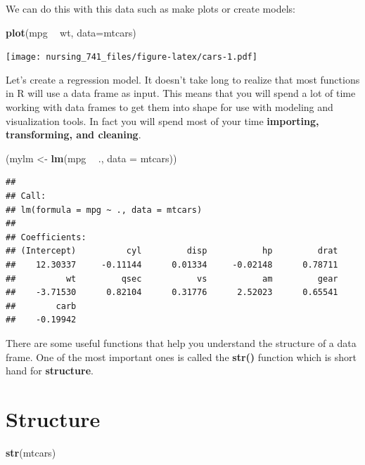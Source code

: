 \documentclass[]{book}
\newenvironment{Shaded}{\begin{snugshade}}{\end{snugshade}}
\newcommand{\KeywordTok}[1]{\textcolor[rgb]{0.13,0.29,0.53}{\textbf{#1}}}
\newcommand{\DataTypeTok}[1]{\textcolor[rgb]{0.13,0.29,0.53}{#1}}
\newcommand{\StringTok}[1]{\textcolor[rgb]{0.31,0.60,0.02}{#1}}
\newcommand{\OperatorTok}[1]{\textcolor[rgb]{0.81,0.36,0.00}{\textbf{#1}}}
\newcommand{\NormalTok}[1]{#1}
\begin{document}
We can do this with this data such as make plots or create models:

\begin{Shaded}
\begin{Highlighting}[]
\KeywordTok{plot}\NormalTok{(mpg }\OperatorTok{~}\StringTok{ }\NormalTok{wt, }\DataTypeTok{data=}\NormalTok{mtcars)}
\end{Highlighting}
\end{Shaded}

\texttt{[image: nursing\_741\_files/figure-latex/cars-1.pdf]}

Let's create a regression model. It doesn't take long to realize that
most functions in R will use a data frame as input. This means that you
will spend a lot of time working with data frames to get them into shape
for use with modeling and visualization tools. In fact you will spend
most of your time \textbf{importing, transforming, and cleaning}.

\begin{Shaded}
\begin{Highlighting}[]
\NormalTok{(mylm <-}\StringTok{ }\KeywordTok{lm}\NormalTok{(mpg }\OperatorTok{~}\StringTok{ }\NormalTok{., }\DataTypeTok{data =}\NormalTok{ mtcars))}
\end{Highlighting}
\end{Shaded}

\begin{verbatim}
## 
## Call:
## lm(formula = mpg ~ ., data = mtcars)
## 
## Coefficients:
## (Intercept)          cyl         disp           hp         drat  
##    12.30337     -0.11144      0.01334     -0.02148      0.78711  
##          wt         qsec           vs           am         gear  
##    -3.71530      0.82104      0.31776      2.52023      0.65541  
##        carb  
##    -0.19942
\end{verbatim}

There are some useful functions that help you understand the structure
of a data frame. One of the most important ones is called the
\textbf{str()} function which is short hand for \textbf{structure}.

\section{Structure}\label{structure}

\begin{Shaded}
\begin{Highlighting}[]
\KeywordTok{str}\NormalTok{(mtcars)}
\end{Highlighting}
\end{Shaded}
\end{document}
